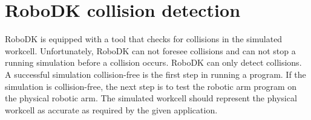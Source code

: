\section{RoboDK collision detection}

RoboDK is equipped with a tool that checks for collisions in the simulated workcell. Unfortunately, RoboDK can not foresee collisions and can not stop a running simulation before a collision occurs. RoboDK can only detect collisions. A successful simulation collision-free is the first step in running a program. If the simulation is collision-free, the next step is to test the robotic arm program on the physical robotic arm. The simulated workcell should represent the physical workcell as accurate as required by the given application. 

